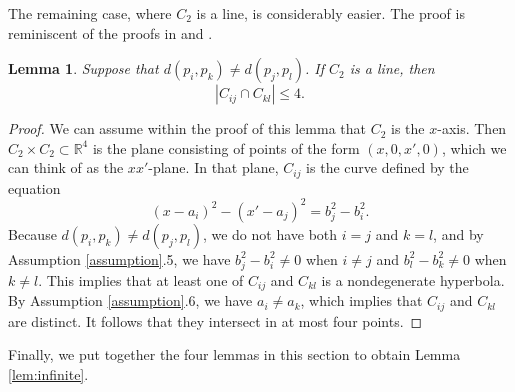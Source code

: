 \documentclass[12pt]{article}
\newtheorem{lemma}[theorem]{Lemma}
\newcommand{\RR}{\mathbb R}
\begin{document}


The remaining case, where $C_2$ is a line, is considerably easier.
The proof is reminiscent of the proofs in \cite{sharir:distances} and \cite{sheffer:few}.

\begin{lemma}\label{lem:line}
 Suppose that $d(p_i, p_k) \neq d(p_j, p_l)$.
 If $C_2$ is a line, then $$|C_{ij}\cap C_{kl}| \leq 4.$$
\end{lemma}
\begin{proof}
We can assume within the proof of this lemma that $C_2$ is the $x$-axis.
Then $C_2\times C_2\subset \RR^4$ is the plane consisting of points of the form $(x,0,x',0)$, 
which we can think of as the $xx'$-plane.
In that plane, $C_{ij}$ is the curve defined by the equation
$$(x-a_i)^2 - (x'-a_j)^2 = b_j^2-b_i^2.$$
Because $d(p_i, p_k) \neq d(p_j, p_l)$, we do not have both $i=j$ and $k=l$,
and by Assumption \ref{assumption}.5, we have $b_j^2 - b_i^2 \neq 0$ when $i\neq j$ and $b_l^2 - b_k^2 \neq 0$ when $k\neq l$.
This implies that at least one of $C_{ij}$ and $C_{kl}$ is a nondegenerate hyperbola.
By Assumption \ref{assumption}.6, we have $a_i\neq a_k$, which implies that $C_{ij}$ and $C_{kl}$ are distinct.
It follows that they intersect in at most four points.
\end{proof}

Finally, we put together the four lemmas in this section to obtain Lemma \ref{lem:infinite}.
\end{document}
